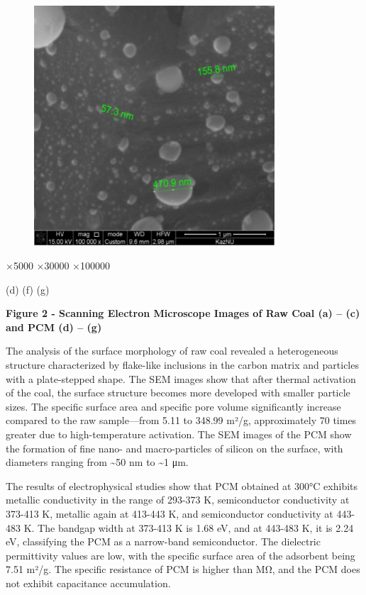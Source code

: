 \begin{figure}[H]
	\centering
	\includegraphics[width=0.8\textwidth]{assets/1072}
	\caption*{}
\end{figure}

×5000 ×30000 ×100000

(d) (f) (g)

{\bfseries Figure 2 - Scanning Electron Microscope Images of Raw Coal (a)
-- (c) and PCM (d) -- (g)}

The analysis of the surface morphology of raw coal revealed a
heterogeneous structure characterized by flake-like inclusions in the
carbon matrix and particles with a plate-stepped shape. The SEM images
show that after thermal activation of the coal, the surface structure
becomes more developed with smaller particle sizes. The specific surface
area and specific pore volume significantly increase compared to the raw
sample---from 5.11 to 348.99 m²/g, approximately 70 times greater due to
high-temperature activation. The SEM images of the PCM show the
formation of fine nano- and macro-particles of silicon on the surface,
with diameters ranging from \textasciitilde50 nm to \textasciitilde1 μm.

The results of electrophysical studies show that PCM obtained at 300°C
exhibits metallic conductivity in the range of 293-373 K, semiconductor
conductivity at 373-413 K, metallic again at 413-443 K, and
semiconductor conductivity at 443-483 K. The bandgap width at 373-413 K
is 1.68 eV, and at 443-483 K, it is 2.24 eV, classifying the PCM as a
narrow-band semiconductor. The dielectric permittivity values are low,
with the specific surface area of the adsorbent being 7.51 m²/g. The
specific resistance of PCM is higher than MΩ, and the PCM does not
exhibit capacitance accumulation.

